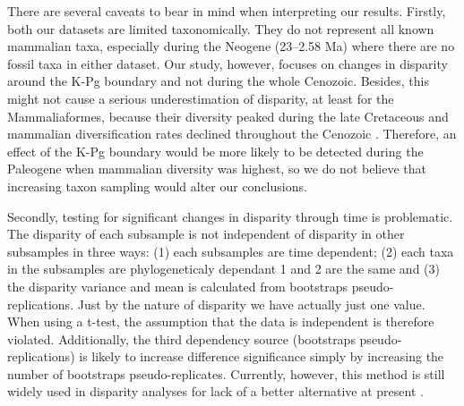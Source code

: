 \documentclass[12pt,letterpaper]{article}
\begin{document}
There are several caveats to bear in mind when interpreting our results. 
Firstly, both our datasets are limited taxonomically.
They do not represent all known mammalian taxa, especially during the Neogene (23--2.58 Ma) where there are no fossil taxa in either dataset.
Our study, however, focuses on changes in disparity around the K-Pg boundary and not during the whole Cenozoic.
Besides, this might not cause a serious underestimation of disparity, at least for the Mammaliaformes, because their diversity peaked during the late Cretaceous \citep[Campanian; 72.1--83.6 Ma;][]{Newham201432} and mammalian diversification rates declined throughout the Cenozoic \citep{Raia2012}.
Therefore, an effect of the K-Pg boundary would be more likely to be detected during the Paleogene when mammalian diversity was highest, so we do not believe that increasing taxon sampling would alter our conclusions.

Secondly, testing for significant changes in disparity through time is problematic.
The disparity of each subsample is not independent of disparity in other subsamples in three ways: (1) each subsamples are time dependent; (2) each taxa in the subsamples are phylogeneticaly dependant 1 and 2 are the same
and (3) the disparity variance and mean is calculated from bootstraps pseudo-replications. Just by the nature of disparity we have actually just one value.
When using a t-test, the assumption that the data is independent is therefore violated.
Additionally, the third dependency source (bootstraps pseudo-replications) is likely to increase difference significance simply by increasing the number of bootstraps pseudo-replicates.
Currently, however, this method is still widely used in disparity analyses for lack of a better alternative at present \citep[e.g.][]{anderson2012using,zelditch2012geometric,smith2014joined}.%
%
%
\end{document}
